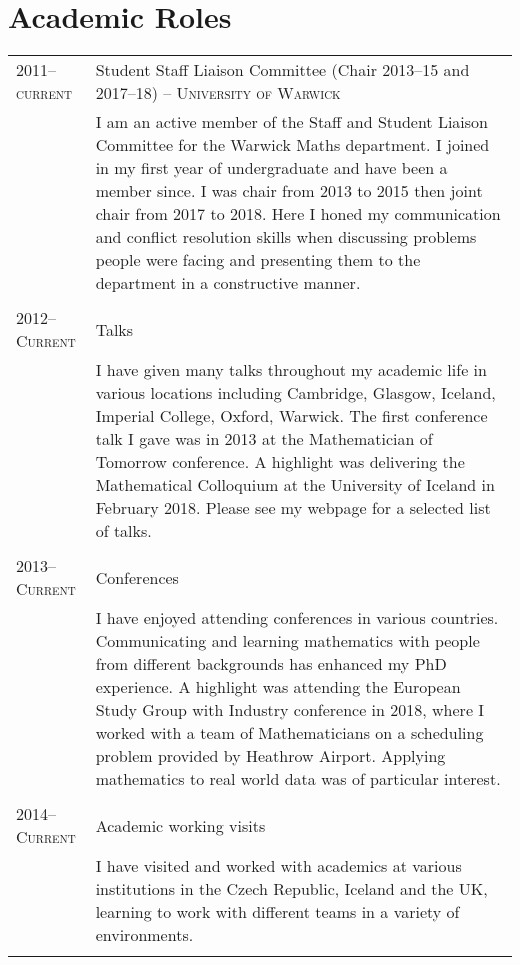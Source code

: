 \documentclass[a4paper,10pt]{article}
\begin{document}
\section{Academic Roles}
\begin{tabular}{p{2.25cm}|p{15cm}}
	\textsc{2011--current}& Student Staff Liaison Committee (Chair 2013--15 and 2017--18) -- \textsc{University of Warwick}\\&\footnotesize{I am an active member of the Staff and Student Liaison Committee for the Warwick Maths department. I joined in my first year of undergraduate and have been a member since. I was chair from 2013 to 2015 then joint chair from 2017 to 2018. Here I honed my communication and conflict resolution skills when discussing problems people were facing and presenting them to the department in a constructive manner.}\\\multicolumn{2}{c}{} \\
	\textsc{2012--Current} & Talks\\&\footnotesize{I have given many talks throughout my academic life in various locations including Cambridge, Glasgow, Iceland, Imperial College, Oxford, Warwick. The first conference talk I gave was in 2013 at the Mathematician of Tomorrow conference. A highlight was delivering the Mathematical Colloquium at the University of Iceland in February 2018. Please see my webpage for a selected list of talks.}\\\multicolumn{2}{c}{}\\
	\textsc{2013--Current} & Conferences \\&\footnotesize{I have enjoyed attending conferences in various countries. Communicating and learning mathematics with people from different backgrounds has enhanced my PhD experience. A highlight was attending the European Study Group with Industry conference in 2018, where I worked with a team of Mathematicians on a scheduling problem provided by Heathrow Airport. Applying mathematics to real world data was of particular interest.}\\\multicolumn{2}{c}{} \\
	\textsc{2014--Current} & Academic working visits \\&\footnotesize{I have visited and worked with academics at various institutions in the Czech Republic, Iceland and the UK, learning to work with different teams in a variety of environments.}\\\multicolumn{2}{c}{} \\
\end{tabular}
\end{document}
